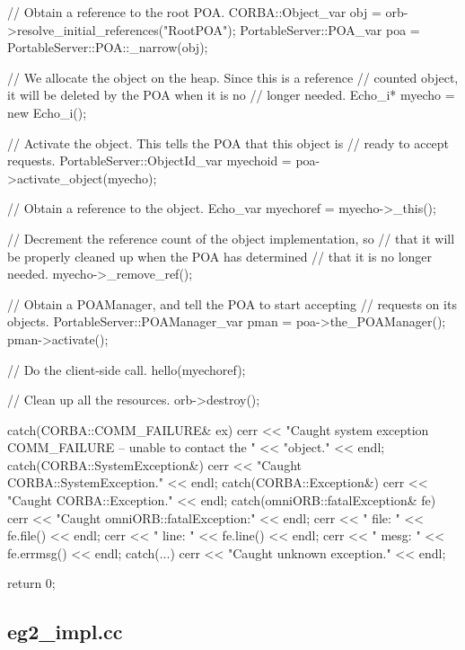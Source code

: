 \documentclass[11pt,twoside,a4paper]{book}
\begin{document}
\begin{cxxlisting}
{{    // Obtain a reference to the root POA.
    CORBA::Object_var obj = orb->resolve_initial_references("RootPOA");
    PortableServer::POA_var poa = PortableServer::POA::_narrow(obj);

      // We allocate the object on the heap.  Since this is a reference
      // counted object, it will be deleted by the POA when it is no
      // longer needed.
    Echo_i* myecho = new Echo_i();

    // Activate the object.  This tells the POA that this object is
    // ready to accept requests.
    PortableServer::ObjectId_var myechoid = poa->activate_object(myecho);

      // Obtain a reference to the object.
    Echo_var myechoref = myecho->_this();

    // Decrement the reference count of the object implementation, so
    // that it will be properly cleaned up when the POA has determined
    // that it is no longer needed.
    myecho->_remove_ref();

    // Obtain a POAManager, and tell the POA to start accepting
    // requests on its objects.
    PortableServer::POAManager_var pman = poa->the_POAManager();
    pman->activate();

    // Do the client-side call.
    hello(myechoref);

    // Clean up all the resources.
    orb->destroy();
  }
  catch(CORBA::COMM_FAILURE& ex) {
    cerr << "Caught system exception COMM_FAILURE -- unable to contact the "
         << "object." << endl;
  }
  catch(CORBA::SystemException&) {
    cerr << "Caught CORBA::SystemException." << endl;
  }
  catch(CORBA::Exception&) {
    cerr << "Caught CORBA::Exception." << endl;
  }
  catch(omniORB::fatalException& fe) {
    cerr << "Caught omniORB::fatalException:" << endl;
    cerr << "  file: " << fe.file() << endl;
    cerr << "  line: " << fe.line() << endl;
    cerr << "  mesg: " << fe.errmsg() << endl;
  }
  catch(...) {
    cerr << "Caught unknown exception." << endl;
  }

  return 0;
}
\end{cxxlisting}


\clearpage
\subsection{eg2\_impl.cc}
\end{document}
